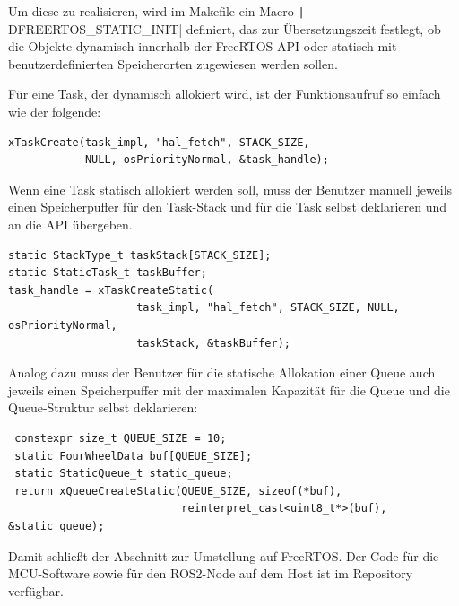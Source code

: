 Um diese zu realisieren, wird im Makefile ein Macro
\texttt|-DFREERTOS_STATIC_INIT| definiert, das zur
Übersetzungszeit festlegt, ob die Objekte dynamisch innerhalb der FreeRTOS-API
oder statisch mit benutzerdefinierten Speicherorten zugewiesen werden sollen.

Für eine Task, der dynamisch allokiert wird, ist der Funktionsaufruf so einfach
wie der folgende:

\begin{code}
\begin{verbatim}
xTaskCreate(task_impl, "hal_fetch", STACK_SIZE,
            NULL, osPriorityNormal, &task_handle);
\end{verbatim}
\end{code}

Wenn eine Task statisch allokiert werden soll, muss der Benutzer manuell jeweils
einen Speicherpuffer für den Task-Stack und für die Task selbst deklarieren und
an die API übergeben.

\begin{code}
\begin{verbatim}
static StackType_t taskStack[STACK_SIZE];
static StaticTask_t taskBuffer;
task_handle = xTaskCreateStatic(
                    task_impl, "hal_fetch", STACK_SIZE, NULL, osPriorityNormal,
                    taskStack, &taskBuffer);
\end{verbatim}
\end{code}

Analog dazu muss der Benutzer für die statische Allokation einer Queue auch
jeweils einen Speicherpuffer mit der maximalen Kapazität für die Queue und die
Queue-Struktur selbst deklarieren:

\begin{code}
\begin{verbatim}
 constexpr size_t QUEUE_SIZE = 10;
 static FourWheelData buf[QUEUE_SIZE];
 static StaticQueue_t static_queue;
 return xQueueCreateStatic(QUEUE_SIZE, sizeof(*buf),
                           reinterpret_cast<uint8_t*>(buf), &static_queue);
\end{verbatim}
\end{code}

Damit schließt der Abschnitt zur Umstellung auf FreeRTOS. Der Code für die
MCU-Software sowie für den ROS2-Node auf dem Host ist im
Repository~\cite{mecarover_freertos_profiling} verfügbar.

